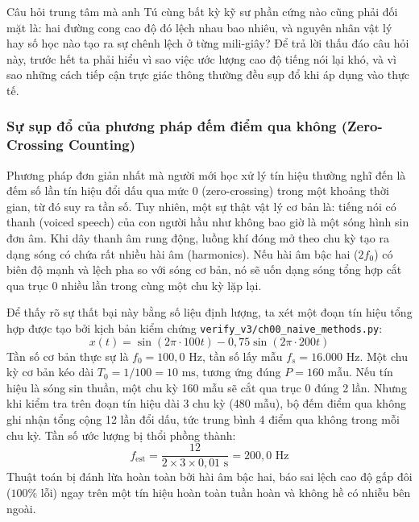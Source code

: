 Câu hỏi trung tâm mà anh Tú cùng bất kỳ kỹ sư phần cứng nào cũng phải đối mặt là: hai đường cong cao độ đó lệch nhau bao nhiêu, và nguyên nhân vật lý hay số học nào tạo ra sự chênh lệch ở từng mili-giây? Để trả lời thấu đáo câu hỏi này, trước hết ta phải hiểu vì sao việc ước lượng cao độ tiếng nói lại khó, và vì sao những cách tiếp cận trực giác thông thường đều sụp đổ khi áp dụng vào thực tế.

\subsubsection*{Sự sụp đổ của phương pháp đếm điểm qua không (Zero-Crossing Counting)}
Phương pháp đơn giản nhất mà người mới học xử lý tín hiệu thường nghĩ đến là đếm số lần tín hiệu đổi dấu qua mức 0 (zero-crossing) trong một khoảng thời gian, từ đó suy ra tần số. Tuy nhiên, một sự thật vật lý cơ bản là: tiếng nói có thanh (voiced speech) của con người hầu như không bao giờ là một sóng hình sin đơn âm. Khi dây thanh âm rung động, luồng khí đóng mở theo chu kỳ tạo ra dạng sóng có chứa rất nhiều hài âm (harmonics). Nếu hài âm bậc hai ($2 f_0$) có biên độ mạnh và lệch pha so với sóng cơ bản, nó sẽ uốn dạng sóng tổng hợp cắt qua trục 0 nhiều lần trong cùng một chu kỳ lặp lại.

Để thấy rõ sự thất bại này bằng số liệu định lượng, ta xét một đoạn tín hiệu tổng hợp được tạo bởi kịch bản kiểm chứng \texttt{verify\_v3/ch00\_naive\_methods.py}:
\begin{equation}
x(t) = \sin(2\pi \cdot 100 t) - 0{,}75 \sin(2\pi \cdot 200 t)
\end{equation}
Tần số cơ bản thực sự là $f_0 = 100{,}0\text{ Hz}$, tần số lấy mẫu $f_s = 16.000\text{ Hz}$. Một chu kỳ cơ bản kéo dài $T_0 = 1/100 = 10\text{ ms}$, tương ứng đúng $P = 160$ mẫu. Nếu tín hiệu là sóng sin thuần, một chu kỳ 160 mẫu sẽ cắt qua trục 0 đúng 2 lần. Nhưng khi kiểm tra trên đoạn tín hiệu dài 3 chu kỳ (480 mẫu), bộ đếm điểm qua không ghi nhận tổng cộng 12 lần đổi dấu, tức trung bình 4 điểm qua không trong mỗi chu kỳ. Tần số ước lượng bị thổi phồng thành:
\begin{equation}
f_{\text{est}} = \frac{12}{2 \times 3 \times 0{,}01\text{ s}} = 200{,}0\text{ Hz}
\end{equation}
Thuật toán bị đánh lừa hoàn toàn bởi hài âm bậc hai, báo sai lệch cao độ gấp đôi ($100\%$ lỗi) ngay trên một tín hiệu hoàn toàn tuần hoàn và không hề có nhiễu bên ngoài.


